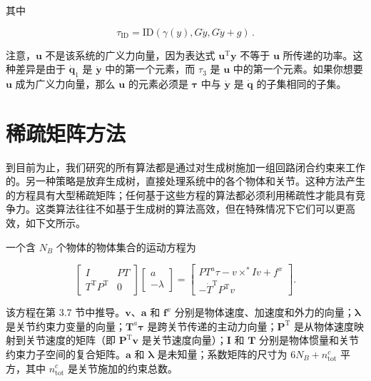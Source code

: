 \documentclass[10pt,a4paper]{book}
\theoremstyle{thmstyle} %
\theoremstyle{defstyle} %
\theoremstyle{prostyle} %
\begin{document}
其中



$$
\tau _ { \mathrm { I D } } = \mathrm { I D } ( \gamma ( y ) , G \ddot { y } , G \ddot { y } + g ) \, .
$$



注意，$\boldsymbol{u}$ 不是该系统的广义力向量，因为表达式 $\boldsymbol{u}^{\mathrm{T}}\boldsymbol{y}$ 不等于 $\boldsymbol{u}$ 所传递的功率。这种差异是由于 $\dot{\boldsymbol{q}}_{1}$ 是 $\dot{\boldsymbol{y}}$ 中的第一个元素，而 $\tau_{3}$ 是 $\boldsymbol{u}$ 中的第一个元素。如果你想要 $\boldsymbol{u}$ 成为广义力向量，那么 $\boldsymbol{u}$ 的元素必须是 $\boldsymbol{\tau}$ 中与 $\dot{\boldsymbol{y}}$ 是 $\dot{\boldsymbol{q}}$ 的子集相同的子集。



\section{稀疏矩阵方法}





到目前为止，我们研究的所有算法都是通过对生成树施加一组回路闭合约束来工作的。另一种策略是放弃生成树，直接处理系统中的各个物体和关节。这种方法产生的方程具有大型稀疏矩阵；任何基于这些方程的算法都必须利用稀疏性才能具有竞争力。这类算法往往不如基于生成树的算法高效，但在特殊情况下它们可以更高效，如下文所示。



一个含 $N_{B}$ 个物体的物体集合的运动方程为



$$
\left[ \begin{array}{ll} { I } & { P T } \\{ T ^{\mathrm { T} } P ^{\mathrm { T} } } & { 0 } \end{array} \right] \left[ \begin{array}{l} { a } \\{ - \lambda } \end{array} \right] = \left[ \begin{array}{l} { P T ^{a} \tau - v \times ^{*} I v + f ^{x} } \\{ - \dot { T } ^{\mathrm { T} } P ^{\mathrm { T} } v } \end{array} \right] .
$$



该方程在第 3.7 节中推导。$\boldsymbol{v}$、$\boldsymbol{a}$ 和 $\boldsymbol{f}^{x}$ 分别是物体速度、加速度和外力的向量；$\boldsymbol{\lambda}$ 是关节约束力变量的向量；$\boldsymbol{T}^{a}\boldsymbol{\tau}$ 是跨关节传递的主动力向量；$\boldsymbol{P}^{\mathrm{T}}$ 是从物体速度映射到关节速度的矩阵（即 $\boldsymbol{P}^{\mathrm{T}}\boldsymbol{v}$ 是关节速度向量）；$\boldsymbol{I}$ 和 $\boldsymbol{T}$ 分别是物体惯量和关节约束力子空间的复合矩阵。$\boldsymbol{a}$ 和 $\boldsymbol{\lambda}$ 是未知量；系数矩阵的尺寸为 $6N_{B}+n_{\mathrm{tot}}^{c}$ 平方，其中 $n_{\mathrm{tot}}^{c}$ 是关节施加的约束总数。
\end{document}
